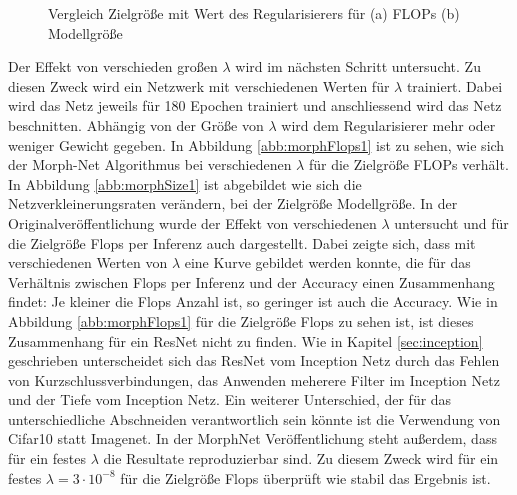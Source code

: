 \begin{figure}
     \centering
     \hfill
     \caption{Vergleich Zielgröße mit Wert des Regularisierers für (a) FLOPs (b) Modellgröße }
     \label{abb:morph1}
\end{figure}

Der Effekt von verschieden großen $\lambda$ wird im nächsten Schritt untersucht. Zu diesen Zweck wird ein Netzwerk mit verschiedenen Werten für $\lambda$ trainiert. Dabei wird das Netz jeweils für 180 Epochen trainiert und anschliessend wird das Netz beschnitten. Abhängig von der Größe von $\lambda$ wird dem Regularisierer mehr oder weniger Gewicht gegeben. In Abbildung \ref{abb:morphFlops1} ist zu sehen, wie sich der Morph-Net Algorithmus bei verschiedenen $\lambda$ für die Zielgröße FLOPs verhält. In Abbildung \ref{abb:morphSize1} ist abgebildet wie sich die Netzverkleinerungsraten verändern, bei der Zielgröße Modellgröße. In der Originalveröffentlichung wurde der Effekt von verschiedenen $\lambda$ untersucht und für die Zielgröße Flops per Inferenz auch dargestellt. Dabei zeigte sich, dass mit verschiedenen Werten von $\lambda$ eine Kurve gebildet werden konnte, die für das Verhältnis zwischen Flops per Inferenz und der Accuracy einen Zusammenhang findet: Je kleiner die Flops Anzahl ist, so geringer ist auch die Accuracy. Wie in Abbildung \ref{abb:morphFlops1} für die Zielgröße Flops zu sehen ist, ist dieses Zusammenhang für ein ResNet nicht zu finden. Wie in Kapitel \ref{sec:inception} geschrieben unterscheidet sich das ResNet vom Inception Netz durch das Fehlen von Kurzschlussverbindungen, das Anwenden meherere Filter im Inception Netz und der Tiefe vom Inception Netz. Ein weiterer Unterschied, der für das unterschiedliche Abschneiden verantwortlich sein könnte ist die Verwendung von Cifar10 statt Imagenet. In der MorphNet Veröffentlichung steht außerdem, dass für ein festes $\lambda$ die Resultate reproduzierbar sind. Zu diesem Zweck wird für ein festes $\lambda =3\cdot 10^{-8}$ für die Zielgröße Flops überprüft wie stabil das Ergebnis ist. 

